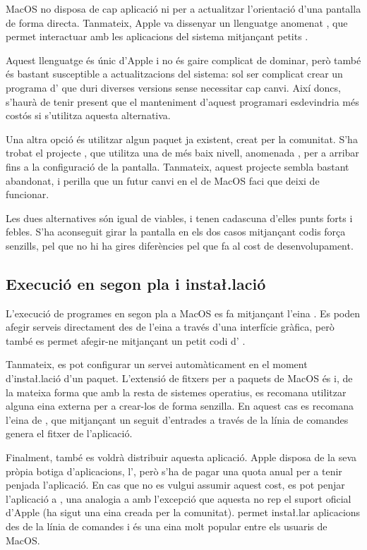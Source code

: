 MacOS no disposa de cap aplicació ni  per a actualitzar l'orientació
d'una pantalla de forma directa. Tanmateix, Apple va dissenyar un llenguatge anomenat
, que permet interactuar amb les aplicacions del sistema
mitjançant petits  \cite{AppleScript}.

Aquest llenguatge és únic d'Apple i no és gaire complicat de dominar, però
també és bastant susceptible a actualitzacions del sistema: sol ser complicat
crear un programa d' que duri diverses versions sense
necessitar cap canvi. Així doncs, s'haurà de tenir present que el manteniment
d'aquest programari esdevindria més costós si s'utilitza aquesta alternativa.

Una altra opció és utilitzar algun paquet ja existent, creat per la comunitat.
S'ha trobat el projecte  \cite{FBRotate}, que utilitza una
 de més baix nivell, anomenada , per a arribar fins a
la configuració de la pantalla. Tanmateix, aquest projecte sembla bastant
abandonat, i perilla que un futur canvi en el  de MacOS faci que
deixi de funcionar.

Les dues alternatives són igual de viables, i tenen cadascuna d'elles punts
forts i febles. S'ha aconseguit girar la pantalla en els dos casos mitjançant
codis força senzills, pel que no hi ha gires diferències pel que fa al cost
de desenvolupament.

\subsection{Execució en segon pla i insta\l.lació}

L'execució de programes en segon pla a MacOS es fa mitjançant l'eina
. Es poden afegir serveis directament des de l'eina 
a través d'una interfície gràfica, però també es permet afegir-ne mitjançant un
petit codi d' \cite{AppleService}.

Tanmateix, es pot configurar un servei automàticament en el moment
d'insta\l.lació d'un paquet. L'extensió de fitxers per a paquets de MacOS és
 i, de la mateixa forma que amb la resta de sistemes operatius,
es recomana utilitzar alguna eina externa per a crear-los de forma senzilla.
En aquest cas es recomana l'eina de \cite{ApplePackage}, que mitjançant un
seguit d'entrades a través de la línia de comandes genera el fitxer 
de l'aplicació.

Finalment, també es voldrà distribuir aquesta aplicació. Apple disposa de la
seva pròpia botiga d'aplicacions, l', però s'ha de pagar una
quota anual per a tenir penjada l'aplicació. En cas que no es vulgui assumir
aquest cost, es pot penjar l'aplicació a , una
analogia a  amb l'excepció que aquesta no rep el suport oficial
d'Apple (ha sigut una eina creada per la comunitat).  permet
insta\l.lar aplicacions des de la línia de comandes i és una eina molt popular
entre els usuaris de MacOS.

